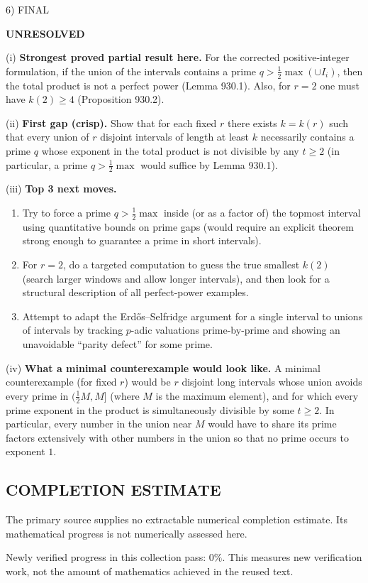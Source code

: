 6) FINAL

\textbf{UNRESOLVED}

(i) \textbf{Strongest proved partial result here.}
For the corrected positive-integer formulation, if the union of the intervals contains a prime $q>\tfrac12\max(\cup I_i)$, then the total product is not a perfect power (Lemma 930.1). Also, for $r=2$ one must have $k(2)\ge 4$ (Proposition 930.2).

(ii) \textbf{First gap (crisp).}
Show that for each fixed $r$ there exists $k=k(r)$ such that every union of $r$ disjoint intervals of length at least $k$ necessarily contains a prime $q$ whose exponent in the total product is not divisible by any $t\ge 2$ (in particular, a prime $q>\tfrac12\max$ would suffice by Lemma 930.1).

(iii) \textbf{Top 3 next moves.}
\begin{enumerate}
\item Try to force a prime $q>\tfrac12\max$ inside (or as a factor of) the topmost interval using quantitative bounds on prime gaps (would require an explicit theorem strong enough to guarantee a prime in short intervals).
\item For $r=2$, do a targeted computation to guess the true smallest $k(2)$ (search larger windows and allow longer intervals), and then look for a structural description of all perfect-power examples.
\item Attempt to adapt the Erd\H{o}s--Selfridge argument for a single interval to unions of intervals by tracking $p$-adic valuations prime-by-prime and showing an unavoidable ``parity defect'' for some prime.
\end{enumerate}

(iv) \textbf{What a minimal counterexample would look like.}
A minimal counterexample (for fixed $r$) would be $r$ disjoint long intervals whose union avoids every prime in $(\tfrac12M,M]$ (where $M$ is the maximum element), and for which every prime exponent in the product is simultaneously divisible by some $t\ge 2$. In particular, every number in the union near $M$ would have to share its prime factors extensively with other numbers in the union so that no prime occurs to exponent $1$.




\subsection*{COMPLETION ESTIMATE}
The primary source supplies no extractable numerical completion estimate. Its mathematical progress is not numerically assessed here.

Newly verified progress in this collection pass: $0\%$. This measures new verification work, not the amount of mathematics achieved in the reused text.

